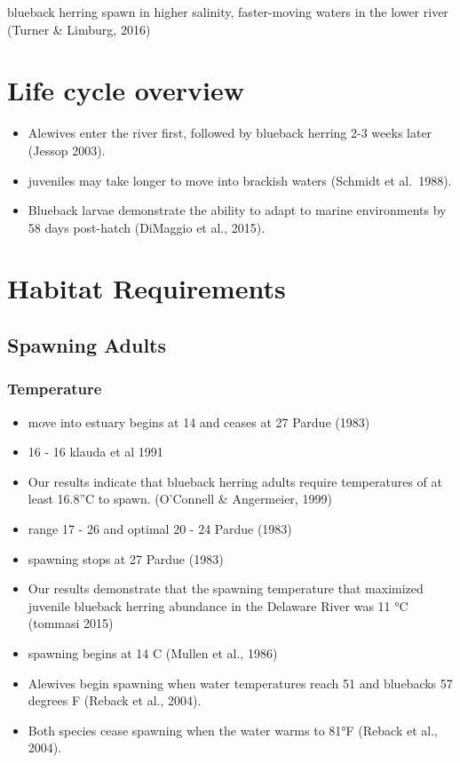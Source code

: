 \documentclass[
]{book}
\providecommand{\tightlist}{%
  \setlength{\itemsep}{0pt}\setlength{\parskip}{0pt}}
\begin{document}
blueback herring spawn in higher salinity, faster-moving waters in the lower river (Turner \& Limburg, 2016)

\hypertarget{life-cycle-overview-1}{%
\section{Life cycle overview}\label{life-cycle-overview-1}}

\begin{itemize}
\tightlist
\item
  Alewives enter the river first, followed by blueback herring 2-3 weeks later (Jessop 2003).
\item
  juveniles may take longer to move into brackish waters (Schmidt et al.~1988).
\item
  Blueback larvae demonstrate the ability to adapt to marine environments by 58 days post-hatch (DiMaggio et al., 2015).
\end{itemize}

\hypertarget{habitat-requirements}{%
\section{Habitat Requirements}\label{habitat-requirements}}

\hypertarget{spawning-adults}{%
\subsection{Spawning Adults}\label{spawning-adults}}

\hypertarget{temperature-3}{%
\subsubsection{Temperature}\label{temperature-3}}

\begin{itemize}
\item
  move into estuary begins at 14 and ceases at 27 Pardue (1983)
\item
  16 - 16 klauda et al 1991
\item
  Our results indicate that blueback herring adults require temperatures of at least 16.8''C to spawn. (O'Connell \& Angermeier, 1999)
\item
  range 17 - 26 and optimal 20 - 24 Pardue (1983)
\item
  spawning stops at 27 Pardue (1983)
\item
  Our results demonstrate that the spawning temperature that maximized juvenile blueback herring abundance in the Delaware River was 11 °C (tommasi 2015)
\item
  spawning begins at 14 C (Mullen et al., 1986)
\item
  Alewives begin spawning when water temperatures reach 51 and bluebacks 57 degrees F (Reback et al., 2004).
\item
  Both species cease spawning when the water warms to 81°F (Reback et al., 2004).
\end{itemize}
\end{document}
